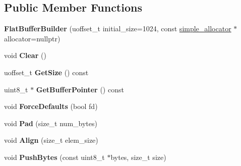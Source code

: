 \subsection*{Public Member Functions}
\begin{DoxyCompactItemize}
\item 
\mbox{\label{classflatbuffers_1_1FlatBufferBuilder_ac72b54a75e0c329e0ce0b8fab758e256}} 
{\bfseries Flat\+Buffer\+Builder} (uoffset\+\_\+t initial\+\_\+size=1024, const \hyperlink{classflatbuffers_1_1simple__allocator}{simple\+\_\+allocator} $\ast$allocator=nullptr)
\item 
\mbox{\label{classflatbuffers_1_1FlatBufferBuilder_ae94b94ba71ea0aeb2d9a98c43b713412}} 
void {\bfseries Clear} ()
\item 
\mbox{\label{classflatbuffers_1_1FlatBufferBuilder_a66c8fd33ab9b3b237954c9ea38648f7f}} 
uoffset\+\_\+t {\bfseries Get\+Size} () const
\item 
\mbox{\label{classflatbuffers_1_1FlatBufferBuilder_ab81ab8aa273c270b0942fd81489cad83}} 
uint8\+\_\+t $\ast$ {\bfseries Get\+Buffer\+Pointer} () const
\item 
\mbox{\label{classflatbuffers_1_1FlatBufferBuilder_a16a8fd46b34ad7727406c37b65b6b27a}} 
void {\bfseries Force\+Defaults} (bool fd)
\item 
\mbox{\label{classflatbuffers_1_1FlatBufferBuilder_a12a56ad2f97e96684cdaf1fb2bc1f54f}} 
void {\bfseries Pad} (size\+\_\+t num\+\_\+bytes)
\item 
\mbox{\label{classflatbuffers_1_1FlatBufferBuilder_a36f8ec515b27ed6daf4ef96722fb00be}} 
void {\bfseries Align} (size\+\_\+t elem\+\_\+size)
\item 
\mbox{\label{classflatbuffers_1_1FlatBufferBuilder_ac9e8e1034d8c1b3bfdf3514fc42d3aef}} 
void {\bfseries Push\+Bytes} (const uint8\+\_\+t $\ast$bytes, size\+\_\+t size)
\item 

\end{DoxyCompactItemize}
